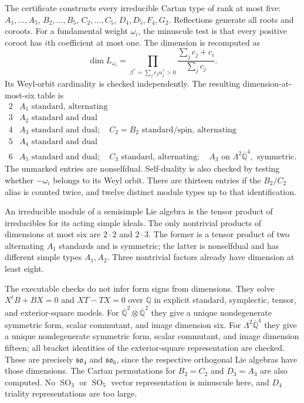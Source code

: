 \documentclass[11pt]{article}
\newcommand{\Q}{\mathbb Q}
\newcommand{\kk}{{\overline{\mathbb Q}}}
\DeclareMathOperator{\SO}{SO}
\theoremstyle{remark}
\begin{document}
The certificate constructs every irreducible Cartan type of rank at
most five: $A_1,\ldots,A_5$, $B_2,\ldots,B_5$,
$C_2,\ldots,C_5$, $D_4,D_5,F_4,G_2$. Reflections generate all roots
and coroots. For a fundamental weight $\omega_i$, the minuscule test
is that every positive coroot has $i$th coefficient at most one.
The dimension is recomputed as
\[
 \dim L_{\omega_i}
 =\prod_{\beta^\vee=\sum_j c_j\alpha_j^\vee>0}
       \frac{\sum_j c_j+c_i}{\sum_j c_j}.
 \tag{7}
\]
Its Weyl-orbit cardinality is checked independently. The resulting
dimension-at-most-six table is
\[
\begin{array}{c|l}
2&A_1\text{ standard, alternating}\\
3&A_2\text{ standard and dual}\\
4&A_3\text{ standard and dual};\quad C_2=B_2\text{ standard/spin,
alternating}\\
5&A_4\text{ standard and dual}\\
6&A_5\text{ standard and dual};\quad C_3\text{ standard,
alternating};\quad A_3\text{ on }\Lambda^2\kk^4,\text{ symmetric}.
\end{array}
\tag{8}\label{eq:small}
\]
The unmarked entries are nonselfdual. Self-duality is also checked
by testing whether $-\omega_i$ belongs to its Weyl orbit.
There are thirteen entries if the $B_2/C_2$ alias is counted twice,
and twelve distinct module types up to that identification.

An irreducible module of a semisimple Lie algebra is the tensor
product of irreducibles for its acting simple ideals. The only
nontrivial products of dimensions at most six are $2\cdot2$ and
$2\cdot3$. The former is a tensor product of two alternating
$A_1$ standards and is symmetric; the latter is nonselfdual and
has different simple types $A_1,A_2$. Three nontrivial factors
already have dimension at least eight.

The executable checks do not infer form signs from dimensions.
They solve $X^tB+BX=0$ and $XT-TX=0$ over $\Q$ in explicit
standard, symplectic, tensor, and exterior-square models.
For $\kk^2\otimes\kk^2$ they give a unique nondegenerate symmetric
form, scalar commutant, and image dimension six. For
$\Lambda^2\kk^4$ they give a unique nondegenerate symmetric form,
scalar commutant, and image dimension fifteen; all bracket
identities of the exterior-square representation are checked.
These are precisely $\mathfrak{so}_4$ and $\mathfrak{so}_6$,
since the respective orthogonal Lie algebras have those dimensions.
The Cartan permutations for $B_2=C_2$ and $D_3=A_3$ are also
computed. No $\SO_3$ or $\SO_5$ vector representation is
minuscule here, and $D_4$ triality representations are too large.
\end{document}

